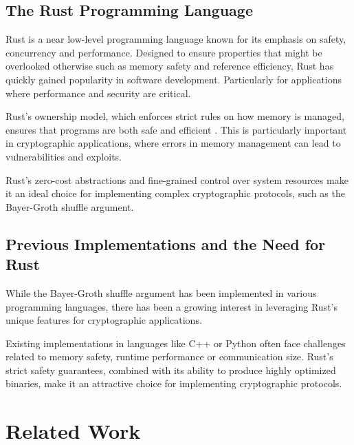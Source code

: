 \documentclass[12pt,a4paper]{report}
\begin{document}
\section{The Rust Programming Language}
Rust \cite{rust} is a near low-level programming language known for its emphasis on safety, concurrency and performance.
Designed to ensure properties that might be overlooked otherwise such as memory safety and
reference efficiency, Rust has quickly gained popularity in software development. 
Particularly for applications where performance and security are critical.\par
Rust's ownership model, which enforces strict rules on how memory is managed, ensures that programs
are both safe and efficient \cite{rust}. This is particularly important in cryptographic applications,
where errors in memory management can lead to vulnerabilities and exploits.\par
Rust's zero-cost abstractions and fine-grained control over system resources make it an ideal
choice for implementing complex cryptographic protocols, such as the Bayer-Groth shuffle argument.
\section{Previous Implementations and the Need for Rust}
While the Bayer-Groth shuffle argument has been implemented in various programming languages, 
there has been a growing interest in leveraging Rust’s unique features for cryptographic applications. \par
Existing implementations in languages like C++ or Python often face challenges related to memory safety, runtime performance or communication size.
Rust’s strict safety guarantees, combined with its ability to produce highly optimized binaries, make it an attractive choice for implementing cryptographic protocols.

\chapter{Related Work}
\end{document}
